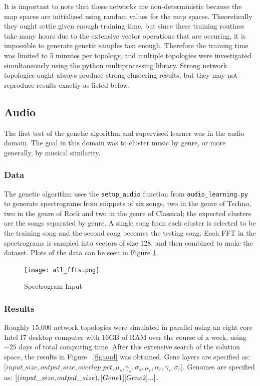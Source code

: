 \documentclass[12pt,a4paper]{article}
\begin{document}
It is important to note that these networks are non-deterministic because the map spaces are initialized using random values for the map spaces.  Theoretically they ought settle given enough training time, but since these training routines take many hours due to the extensive vector operations that are occuring, it is impossible to generate genetic samples fast enough.  Therefore the training time was limited to 5 minutes per topology, and multiple topologies were investigated simultaneously using the python multiprocessing library. Strong network topologies ought always produce strong clustering results, but they may not reproduce results exactly as listed below.

\subsection{Audio}
The first test of the genetic algorithm and supervised learner was in the audio domain.  The goal in this domain was to cluster music by genre, or more generally, by musical similarity. 

\subsubsection{Data}
The genetic algorithm uses the \texttt{setup\_audio} function from \texttt{audio\_learning.py} to generate spectrograms from snippets of six songs, two in the genre of Techno, two in the genre of Rock and two in the genre of Classical; the expected clusters are the songs separated by genre. A single song from each cluster is selected to be the training song and the second song becomes the testing song.  Each FFT in the spectrograms is sampled into vectors of size 128, and then combined to make the dataset.  Plots of the data can be seen in Figure \ref{fig:ffts}.
\begin{figure}[H]
\caption{Spectrogram Input}
\centering
\texttt{[image: all\_ffts.png]}
\label{fig:ffts}
\end{figure}

\subsubsection{Results}
Roughly 15,000 network topologies were simulated in parallel using an eight core Intel I7 desktop computer with 16GB of RAM over the course of a week, using $\sim25$ days of total computing time.  After this extensive search of the solution space, the results in Figure ~\ref{fig:aud} was obtained. Gene layers are specified as:
\newline
$\lbrack input\_size, output\_size, overlap\_pct, \mu_s, \gamma_s, \sigma_s, \mu_r, \alpha_r, \gamma_r, \sigma_r \rbrack$.
\newline
Genomes are specified as:
\newline
$\lbrack (input\_size, output\_size),\\
 \lbrack Gene 1\rbrack \\
 \lbrack Gene 2\rbrack ...\rbrack$.
\newline
\end{document}
